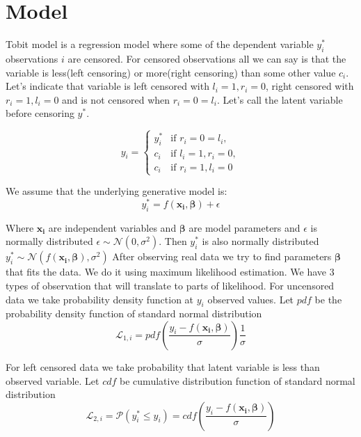 \documentclass[11pt]{article}
\begin{document}
    \section*{Model}
    Tobit model is a regression model where some of the dependent variable $y_{i}^*$ observations $i$ are censored.
    For censored observations all we can say is that the variable is less(left censoring) or more(right censoring) than some other value $c_{i}$.
    Let's indicate that variable is left censored with $l_{i} = 1, r_{i} = 0$, right censored with $r_{i} = 1, l_{i} = 0$ and is not censored when $r_{i} = 0 = l_{i}$.
    Let's call the latent variable before censoring $y^*$.

    \begin{equation}
        y_i = \begin{cases}
                  y_i^* & \text{if } r_{i} = 0 = l_{i}, \\
                  c_i & \text{if } l_{i} = 1, r_{i} = 0, \\
                  c_i & \text{if } r_{i} = 1, l_{i} = 0
        \end{cases}
    \end{equation}

    We assume that the underlying generative model is:
    \begin{equation}
        y^*_i = f(\boldsymbol{x_i},\boldsymbol{\beta}) + \epsilon
    \end{equation}

    Where $\boldsymbol{x_i}$ are independent variables and $\boldsymbol{\beta}$ are model parameters and $\epsilon$ is normally distributed $\epsilon\sim\mathcal{N}(0,\sigma^{2})$.
    Then $y^*_i$ is also normally distributed $y^*_i\sim\mathcal{N}(f(\boldsymbol{x_i},\boldsymbol{\beta}),\sigma^{2})$
    After observing real data we try to find parameters $\boldsymbol{\beta}$ that fits the data.
    We do it using maximum likelihood estimation.
    We have 3 types of observation that will translate to parts of likelihood.
    For uncensored data we take probability density function at $y_i$ observed values. Let $pdf$ be the probability density function of standard normal distribution
    \begin{equation}
        \mathcal{L}_{1,i} = pdf(\frac{y_i - f(\boldsymbol{x_i},\boldsymbol{\beta})}{\sigma}) \frac{1}{\sigma}
    \end{equation}

    For left censored data we take probability that latent variable is less than observed variable. Let $cdf$ be cumulative distribution function of standard normal distribution
    \begin{equation}
        \mathcal{L}_{2,i} = \mathcal{P}(y^*_i \leq y_i) = cdf(\frac{y_i - f(\boldsymbol{x_i},\boldsymbol{\beta})}{\sigma})
    \end{equation}
\end{document}
